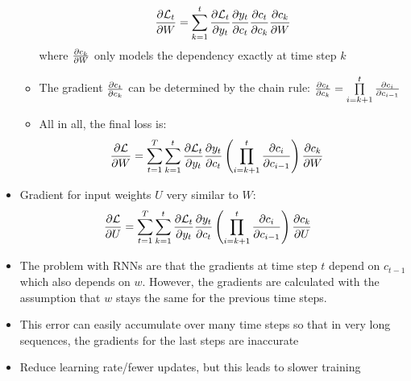 \begin{itemize}
\begin{itemize}
		$$\frac{\partial \mathcal{L}_t}{\partial W} = \sum\limits_{k=1}^{t} \frac{\partial \mathcal{L}_t}{\partial y_t}\frac{\partial y_t}{\partial c_t}\frac{\partial c_t}{\partial c_k}\frac{\partial c_k}{\partial W}$$
		where $\frac{\partial c_k}{\partial W}$ only models the dependency exactly at time step $k$
		\item The gradient $\frac{\partial c_t}{\partial c_k}$ can be determined by the chain rule: $\frac{\partial c_t}{\partial c_k} = \prod\limits_{i=k+1}^{t} \frac{\partial c_i}{\partial c_{i-1}}$
		\item All in all, the final loss is:
		\begin{equation*}
			\begin{split}
				\frac{\partial \mathcal{L}}{\partial W} & = \sum\limits_{t=1}^{T}\sum\limits_{k=1}^{t} \frac{\partial \mathcal{L}_t}{\partial y_t}\frac{\partial y_t}{\partial c_t}\left(\prod\limits_{i=k+1}^{t} \frac{\partial c_i}{\partial c_{i-1}}\right)\frac{\partial c_k}{\partial W}
			\end{split}
		\end{equation*}
	\end{itemize}
	\item Gradient for input weights $U$ very similar to $W$: 
	\begin{equation*}
		\begin{split}
			\frac{\partial \mathcal{L}}{\partial U} & = \sum\limits_{t=1}^{T}\sum\limits_{k=1}^{t} \frac{\partial \mathcal{L}_t}{\partial y_t}\frac{\partial y_t}{\partial c_t}\left(\prod\limits_{i=k+1}^{t} \frac{\partial c_i}{\partial c_{i-1}}\right)\frac{\partial c_k}{\partial U}
		\end{split}
	\end{equation*}
	\item The problem with RNNs are that the gradients at time step $t$ depend on $c_{t-1}$ which also depends on $w$. However, the gradients are calculated with the assumption that $w$ stays the same for the previous time steps.
	\item This error can easily accumulate over many time steps so that in very long sequences, the gradients for the last steps are inaccurate
	\item Reduce learning rate/fewer updates, but this leads to slower training
\end{itemize}
